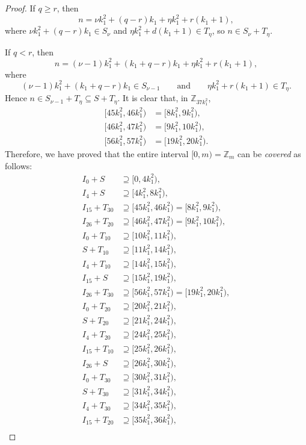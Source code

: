 \documentclass[11pt]{article}
\theoremstyle{definition}
\def\Z{\mbox{$\mathbb Z$}}
\begin{document}
\begin{proof}
If $q \geq r$, then
\[
n = \nu k_1^2 + (q - r) k_1+\eta k_1^2 + r(k_1 + 1), 
\]
where $\nu k_1^2 + (q - r)k_1 \in S_\nu$ and $\eta k_1^2 + d(k_1 + 1) \in T_\eta$, so $n \in S_\nu +T_\eta$. 

If $q <r$, then
\[
n = (\nu  - 1)k_1^2 + (k_1 + q - r) k_1+\eta k_1^2 + r(k_1 + 1), 
\]
where 
\[
(\nu  - 1)k_1^2 + (k_1 + q - r)k_1 \in S_{\nu  - 1}\qquad\text{and}\qquad
\eta k_1^2 + r(k_1 + 1) \in T_\eta.
\]
Hence $n \in S_{\nu-1}+T_\eta\subseteq S+T_{\eta}$. 
It is clear that, in $\Z_{37k_{1}^{2}}$,
\begin{align*}
[45k_{1}^{2},46k_{1}^{2})&=[8k_1^2, 9k_1^2),\\
[46k_{1}^{2},47k_{1}^{2})&=[9k_1^2, 10k_1^2),\\
[56k_{1}^{2},57k_{1}^{2})&=[19k_1^2, 20k_1^2).
\end{align*}
Therefore, we have proved that the entire interval $[0, m)=\Z_{m}$ can be  {\em covered\/} as follows: 
\begin{align*}
I_0 + S  &\supseteq [0, 4k_1^2),\\
I_4 + S  &\supseteq [4k_1^2, 8k_1^2),\\
I_{15} + T_{30}  &\supseteq[45k_{1}^{2},46k_{1}^{2})= [8k_1^2, 9k_1^2),\\
I_{26} + T_{20}  &\supseteq[46k_{1}^{2},47k_{1}^{2})= [9k_1^2, 10k_1^2),\\
I_{0}+T_{10}  &\supseteq [10k_1^2, 11k_1^2),\\
S+T_{10}  &\supseteq [11k_1^2, 14k_1^2),\\
I_{4} + T_{10}  &\supseteq [14k_1^2, 15k_1^2),\\
I_{15} + S  &\supseteq [15k_1^2, 19k_1^2),\\
I_{26} + T_{30}  &\supseteq[56k_{1}^{2},57k_{1}^{2})= [19k_1^2, 20k_1^2),\\
I_{0} + T_{20}  &\supseteq [20k_1^2, 21k_1^2),\\
S + T_{20}  &\supseteq [21k_1^2, 24k_1^2),\\
I_{4} + T_{20}  &\supseteq [24k_1^2, 25k_1^2),\\
I_{15} + T_{10}  &\supseteq [25k_1^2, 26k_1^2),\\
I_{26} + S  &\supseteq [26k_1^2, 30k_1^2),\\
I_{0} + T_{30}  &\supseteq [30k_1^2, 31k_1^2),\\
S + T_{30}  &\supseteq [31k_1^2, 34k_1^2),\\
I_{4} + T_{30}  &\supseteq [34k_1^2, 35k_1^2),\\
I_{15} + T_{20}  &\supseteq [35k_1^2, 36k_1^2),\\

\end{align*}
\end{proof}
\end{document}
